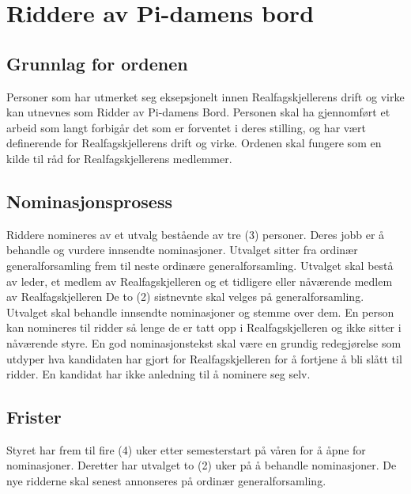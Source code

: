 \section{Riddere av Pi-damens bord} \label{riddere av pi-damens bord}

\subsection{Grunnlag for ordenen} \label{grunnlag for ordenen}

Personer som har utmerket seg eksepsjonelt innen Realfagskjellerens drift og virke kan utnevnes som Ridder av Pi-damens Bord.
Personen skal ha gjennomført et arbeid som langt forbigår det som er forventet i deres stilling, og har vært definerende for Realfagskjellerens drift og virke.
Ordenen skal fungere som en kilde til råd for Realfagskjellerens medlemmer.

\subsection{Nominasjonsprosess} \label{nominasjonsprosess}

Riddere nomineres av  et utvalg bestående av tre (3) personer.
Deres jobb er å behandle og vurdere innsendte nominasjoner.
Utvalget sitter fra ordinær generalforsamling frem til neste ordinære generalforsamling.
Utvalget skal bestå av leder, et medlem av Realfagskjelleren og et tidligere eller nåværende medlem av Realfagskjelleren 
De to (2) sistnevnte skal velges på generalforsamling.
Utvalget skal behandle innsendte nominasjoner og stemme over dem.
En person kan nomineres til ridder så lenge de er tatt opp i Realfagskjelleren og ikke sitter i nåværende styre.
En god nominasjonstekst skal være en grundig redegjørelse som utdyper hva kandidaten har gjort for Realfagskjelleren for å fortjene å bli slått til ridder. 
En kandidat har ikke anledning til å nominere seg selv.

\subsection{Frister} \label{frister}

Styret har frem til fire (4) uker etter semesterstart på våren for å åpne for nominasjoner.
Deretter har utvalget to (2) uker på å behandle nominasjoner.
De nye ridderne skal senest annonseres på ordinær generalforsamling.